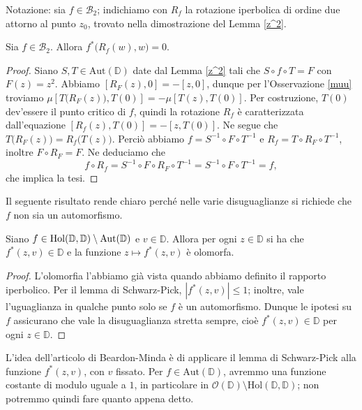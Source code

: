 Notazione: sia $f \in \mathcal{B}_2$; indichiamo con $R_f$ la rotazione iperbolica di ordine due attorno al punto $z_0$, trovato nella dimostrazione del Lemma \ref{z^2}.

\begin{cor} \label{rotazioni}
  Sia $f \in \mathcal{B}_2$. Allora $f^*\bigl(R_f(w),w\bigr)=0$.
\end{cor}

\begin{proof}
  Siano $S, T \in \text{Aut}(\mathbb{D})$ date dal Lemma \ref{z^2} tali che $S\circ f\circ T=F$ con $F(z)=z^2$. Abbiamo $[R_F(z),0]=-[z,0]$, dunque per l'Osservazione \ref{muu} troviamo $\mu[T\bigl(R_F(z)\bigr),T(0)]=-\mu[T(z),T(0)]$.
  Per costruzione, $T(0)$ dev'essere il punto critico di $f$, quindi la rotazione $R_f$ è caratterizzata dall'equazione $[R_f(z),T(0)]=-[z,T(0)]$. Ne segue che $T\bigl(R_F(z)\bigr)=R_f\bigl(T(z)\bigr)$. Perciò abbiamo $f=S^{-1}\circ F\circ T^{-1}$ e $R_f=T\circ R_F\circ T^{-1}$, inoltre $F\circ R_F=F$. Ne deduciamo che
  $$f\circ R_f=S^{-1}\circ F\circ R_F\circ T^{-1}=S^{-1}\circ F\circ T^{-1}=f,$$
  che implica la tesi.
\end{proof}

Il seguente risultato rende chiaro perché nelle varie disuguaglianze si richiede che $f$ non sia un automorfismo.

\begin{prop} \label{24}
  Siano $f \in \text{\normalfont{Hol}}(\mathbb{D},\mathbb{D})\setminus\text{\normalfont{Aut}}(\mathbb{D})$ e $v \in \mathbb{D}$. Allora per ogni $z \in \mathbb{D}$ si ha che $f^*(z,v) \in \mathbb{D}$ e la funzione $z \longmapsto f^*(z,v)$ è olomorfa.
\end{prop}

\begin{proof}
  L'olomorfia l'abbiamo già vista quando abbiamo definito il rapporto iperbolico. Per il lemma di Schwarz-Pick, $|f^*(z,v)| \le 1$; inoltre, vale l'uguaglianza in qualche punto solo se $f$ è un automorfismo. Dunque le ipotesi su $f$ assicurano che vale la disuguaglianza stretta sempre, cioè $f^*(z,v) \in \mathbb{D}$ per ogni $z \in \mathbb{D}$.
\end{proof}

L'idea dell'articolo di Beardon-Minda è di applicare il lemma di Schwarz-Pick alla funzione $f^*(z,v)$, con $v$ fissato. Per $f \in \text{Aut}(\mathbb{D})$, avremmo una funzione costante di modulo uguale a $1$, in particolare in $\mathcal{O}(\mathbb{D})\setminus\text{Hol}(\mathbb{D},\mathbb{D})$; non potremmo quindi fare quanto appena detto.

